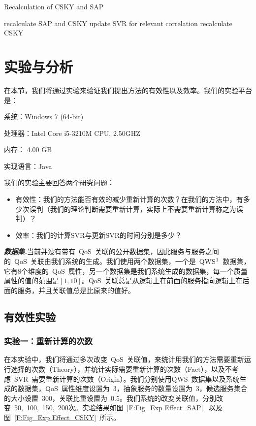\begin{algorithm}[htbp]
\caption{Recalculation of CSKY and SAP}
\label{A:Algo_SVR_Computing}
\KwOut{}
    {
        recalculate SAP and CSKY\;
    }
    \Else
    {
        update SVR for relevant correlation\;
        {
             recalculate CSKY\;
        }
    }
\end{algorithm}

\section{实验与分析}

在本节，我们将通过实验来验证我们提出方法的有效性以及效率。我们的实验平台是：

系统：Windows 7 (64-bit)

处理器：Intel Core i5-3210M CPU, 2.50GHZ

内存： 4.00 GB

实现语言：Java

我们的实验主要回答两个研究问题：
\begin{itemize}
  \item 有效性：我们的方法能否有效的减少重新计算的次数？在我们的方法中，有多少次误判（我们的理论判断需要重新计算，实际上不需要重新计算称之为误判）？
  \item 效率：我们的计算SVR与更新SVR的时间分别是多少？
\end{itemize}

\noindent\textbf{\emph{数据集.}}当前并没有带有~QoS~关联的公开数据集，因此服务与服务之间的~QoS~关联由我们系统的生成。我们使用两个数据集，一个是~QWS$\footnote{\url{http://www.uoguelph.ca/~qmahmoud/qws/}}$~数据集，它有8个维度的~QoS~属性，另一个数据集是我们系统生成的数据集，每一个质量属性的值的范围是$[1,10]$。QoS~关联总是从逻辑上在前面的服务指向逻辑上在后面的服务，并且关联值总是比原来的值好。

\subsection{有效性实验}
\subsubsection{实验一：重新计算的次数}

在本实验中，我们将通过多次改变~QoS~关联值，来统计用我们的方法需要重新运行选择的次数（Theory），并统计实际需要重新计算的次数（Fact），以及不考虑~SVR~需要重新计算的次数（Origin）。我们分别使用QWS~数据集以及系统生成的数据集，QoS~属性维度设置为~3，抽象服务的数量设置为~3，候选服务集合的大小设置~300，关联比重设置为~0.5。我们系统的改变关联值，分别改变~50,~100,~150,~200次。实验结果如图~\ref{F:Fig_Exp Effect_SAP}~ 以及图~\ref{F:Fig_Exp Effect_CSKY}~所示。

